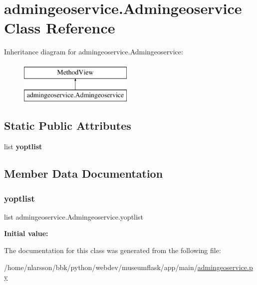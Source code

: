 \hypertarget{classadmingeoservice_1_1Admingeoservice}{}\section{admingeoservice.\+Admingeoservice Class Reference}
\label{classadmingeoservice_1_1Admingeoservice}
Inheritance diagram for admingeoservice.\+Admingeoservice\+:\begin{figure}[H]
\begin{center}
\leavevmode
\includegraphics[height=2.000000cm]{classadmingeoservice_1_1Admingeoservice}
\end{center}
\end{figure}
\subsection*{Static Public Attributes}
\begin{DoxyCompactItemize}
\item 
list {\bfseries yoptlist}
\end{DoxyCompactItemize}


\subsection{Member Data Documentation}
\mbox{\label{classadmingeoservice_1_1Admingeoservice_a8aa8075cbf9503708646a69c6fa61228}} 
\subsubsection{\texorpdfstring{yoptlist}{yoptlist}}
{\footnotesize\ttfamily list admingeoservice.\+Admingeoservice.\+yoptlist\hspace{0.3cm}{\ttfamily [static]}}

{\bfseries Initial value\+:}
\begin{DoxyCode}{0}
\DoxyCodeLine{= [}
\DoxyCodeLine{    }
\DoxyCodeLine{    ]}
\end{DoxyCode}


The documentation for this class was generated from the following file\+:\begin{DoxyCompactItemize}
\item 
/home/nlarsson/bbk/python/webdev/museumflask/app/main/\mbox{\hyperlink{admingeoservice_8py}{admingeoservice.\+py}}\end{DoxyCompactItemize}
